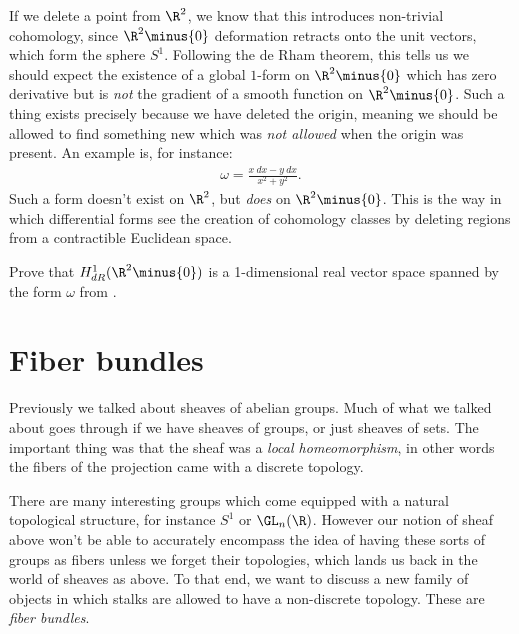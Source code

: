 \documentclass[11pt]{book}
\begin{document}
\begin{remark} If we delete a point from $\R^2$, we know that this introduces non-trivial cohomology, since $\R^2\minus\{0\}$ deformation retracts onto the unit vectors, which form the sphere $S^1$. Following the de Rham theorem, this tells us we should expect the existence of a global $1$-form on $\R^2\minus\{0\}$ which has zero derivative but is \emph{not} the gradient of a smooth function on $\R^2\minus\{0\}$. Such a thing exists precisely because we have deleted the origin, meaning we should be allowed to find something new which was \emph{not allowed} when the origin was present. An example is, for instance:
\begin{equation}\label{eqn:1-form-on-R2-minus-origin}
\begin{aligned}
    \omega = \frac{x\ dx - y\ dx}{x^2 + y^2}.
\end{aligned}
\end{equation}
Such a form doesn't exist on $\R^2$, but \emph{does} on $\R^2\minus\{0\}$. This is the way in which differential forms see the creation of cohomology classes by deleting regions from a contractible Euclidean space.
\end{remark}

\begin{exercise} Prove that $H^1_{dR}(\R^2\minus \{0\})$ is a 1-dimensional real vector space spanned by the form $\omega$ from .
\end{exercise}

\section{Fiber bundles}

Previously we talked about sheaves of abelian groups. Much of what we talked about goes through if we have sheaves of groups, or just sheaves of sets. The important thing was that the sheaf was a \emph{local homeomorphism}, in other words the fibers of the projection came with a discrete topology.

There are many interesting groups which come equipped with a natural topological structure, for instance $S^1$ or $\GL_n(\R)$. However our notion of sheaf above won't be able to accurately encompass the idea of having these sorts of groups as fibers unless we forget their topologies, which lands us back in the world of sheaves as above. To that end, we want to discuss a new family of objects in which stalks are allowed to have a non-discrete topology. These are \emph{fiber bundles}.
\end{document}
